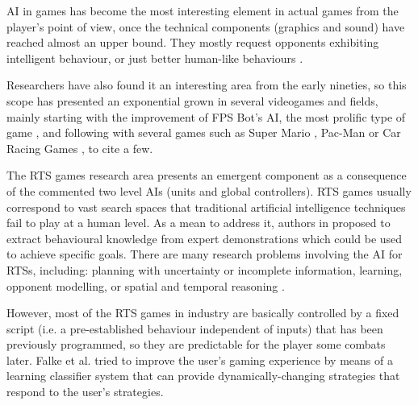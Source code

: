 \documentclass[runningheads]{llncs}
\begin{document}
AI in games has become the most interesting element in actual games from the player's point of view, once the technical components (graphics and sound) have reached almost an upper bound. They mostly request opponents exhibiting intelligent behaviour, or just better human-like behaviours \cite{artifical-stupidity-game-wisdom2-2004}.

Researchers have also found it an interesting area from the early nineties, so this scope has presented an exponential grown in several videogames and fields, mainly starting with the improvement of FPS Bot's AI, the most prolific type of game \cite{laird2001using,cooperativebots_CIG2010}, and following with several games such as Super Mario \cite{Togelius_SuperMario}, Pac-Man \cite{Pac-MAnt_CIG2010} or Car Racing Games \cite{CarRacing_Pelta09}, to cite a few.

The RTS games research area presents an emergent component \cite{emergence_in_games2008} as a consequence of the commented two level AIs (units and global controllers). RTS games usually correspond to vast search spaces that traditional artificial intelligence techniques fail to play at a human level. As a mean to address it, authors in \cite{ontanon2007} proposed to extract behavioural knowledge from expert demonstrations which could be used to achieve specific goals. 
There are many research problems involving the AI for RTSs, including: planning with uncertainty or incomplete information, learning, opponent modelling, or spatial and temporal reasoning \cite{AIRTS2004}. 

However, most of the RTS games in industry are basically controlled by a fixed script (i.e. a pre-established behaviour independent of inputs) that has been previously programmed, so they are predictable for the player some combats later. Falke et al. \cite{falke2003} tried to improve the user's gaming experience by means of a learning classifier system that can provide dynamically-changing strategies that respond to the user's strategies.  



\end{document}
